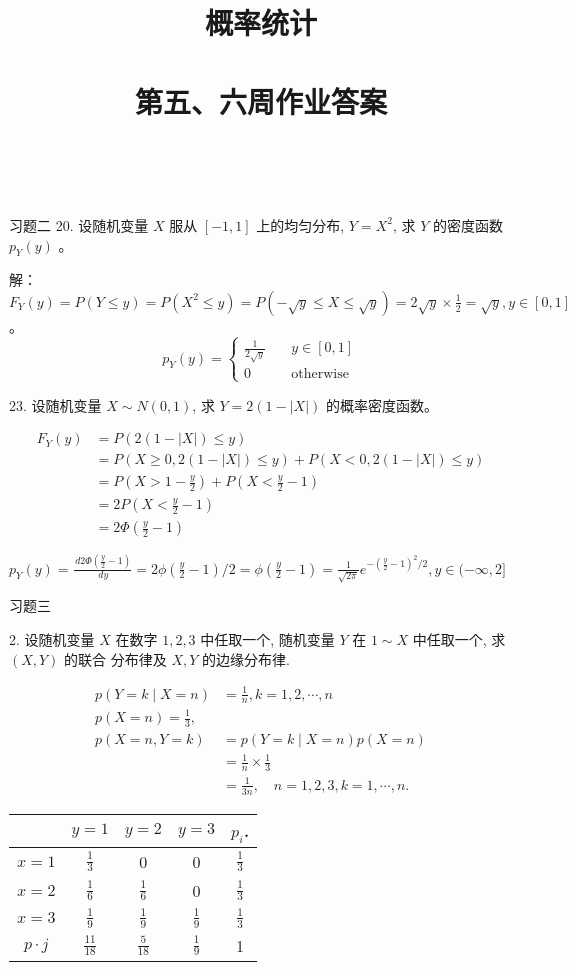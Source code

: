 \documentclass[14pt]{scrartcl} %
\title{	
	\normalfont \huge
	\textsc{概率统计} \\ [25pt] %
	\horrule{0.5pt} \\[0.4cm] %
	\huge 第五、六周作业答案 \\ %
	\horrule{0.5pt} \\[0.4cm] %
	\date{}
}
\numberwithin{equation}{section} %
\numberwithin{figure}{section} %
\numberwithin{table}{section} %
\begin{document}
	\maketitle %
	习题二
	20. 设随机变量 $X$ 服从 $[-1,1]$ 上的均匀分布, $Y=X^{2}$, 求 $Y$ 的密度函数 $p_{Y}(y)$ 。
	
	\vspace*{1cm}
	解：
	$F_Y(y) = P(Y \leq y) = P(X ^ 2 \leq y) = P(-\sqrt{y} \leq X \leq \sqrt{y}) = 2 \sqrt{y} \times \frac{1}{2} = \sqrt{y}, y \in [0, 1]$。
	\[
	p_Y(y) = \left\{
	\begin{array}{cl}
		\frac{1}{2\sqrt{y}} & \quad y \in [0, 1] \\
		0 & \quad \text{otherwise}
	\end{array}
	\right.
	\]
	
	23. 设随机变量 $X \sim N(0,1)$, 求 $Y=2(1-|X|)$ 的概率密度函数。
	
	\vspace*{1cm}
	\begin{align}
		F_Y(y) & = P(2(1 - |X|) \leq y) \\
		& = P( X \geq 0, 2(1 - |X|) \leq y) + P( X < 0, 2(1 - |X|) \leq y) \\
		& = P(X > 1 - \frac{y}{2}) + P(X < \frac{y}{2} - 1) \\
		& = 2P(X < \frac{y}{2} - 1) \\
		& = 2 \Phi(\frac{y}{2} - 1)
	\end{align}
	
	$p_Y(y) = \frac{\,d2\Phi(\frac{y}{2} - 1)}{\,dy} = 2 \phi(\frac{y}{2} - 1) / 2 = \phi(\frac{y}{2} - 1) = \frac{1}{\sqrt{2\pi}}e ^ {-(\frac{y}{2} - 1) ^ 2 / 2}, y \in (-\infty, 2]$
	
	习题三
	
	2. 设随机变量 $X$ 在数字 $1,2,3$ 中任取一个, 随机变量 $Y$ 在 $1 \sim X$ 中任取一个, 求 $(X, Y)$ 的联合 分布律及 $X, Y$ 的边缘分布律.
	
	$$
	\begin{aligned}
		p(Y=k \mid X=n) & =\frac{1}{n}, k=1,2, \cdots, n \\
		p(X=n)=\frac{1}{3}, & \\
		p(X=n, Y=k) & =p(Y=k \mid X=n) p(X=n) \\
		& =\frac{1}{n} \times \frac{1}{3} \\
		& =\frac{1}{3 n}, \quad n=1,2,3, k=1, \cdots, n .
	\end{aligned}
	$$
	\begin{center}
		\begin{tabular}{c|c|c|c|c}
			& $y=1$ & $y=2$ & $y=3$ & $p_{i}$. \\
			\hline
			$x=1$ & $\frac{1}{3}$ & 0 & 0 & $\frac{1}{3}$ \\
			\hline
			$x=2$ & $\frac{1}{6}$ & $\frac{1}{6}$ & 0 & $\frac{1}{3}$ \\
			\hline
			$x=3$ & $\frac{1}{9}$ & $\frac{1}{9}$ & $\frac{1}{9}$ & $\frac{1}{3}$ \\
			\hline
			$p \cdot j$ & $\frac{11}{18}$ & $\frac{5}{18}$ & $\frac{1}{9}$ & 1 \\
			\hline
		\end{tabular}
	\end{center}
	
\end{document}
